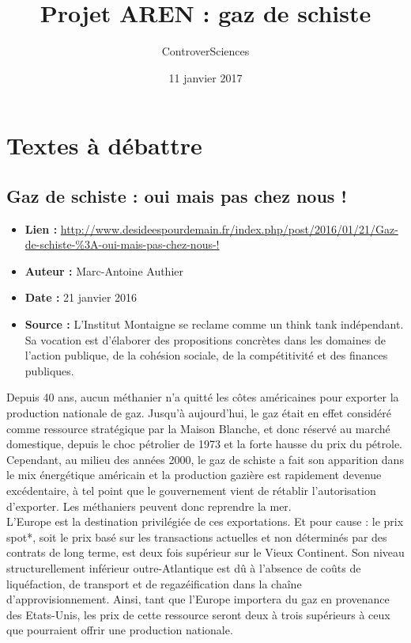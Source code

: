 \documentclass[8pt]{article}
\author{ControverSciences}
\title{Projet AREN : gaz de schiste}
\date{11 janvier 2017}
\begin{document}
\maketitle

\tableofcontents

\newpage
\section{Textes à débattre}
\subsection{Gaz de schiste : oui mais pas chez nous !}
\begin{itemize}
	\item \textbf{Lien : }  \url{http://www.desideespourdemain.fr/index.php/post/2016/01/21/Gaz-de-schiste-\%3A-oui-mais-pas-chez-nous-!} 
	\item \textbf{Auteur : }  Marc-Antoine Authier
	\item \textbf{Date : } 21 janvier 2016 
	\item \textbf{Source : }  L'Institut Montaigne se reclame comme un think tank indépendant. Sa vocation est d'élaborer des propositions concrètes dans les domaines de l'action publique, de la cohésion sociale, de la compétitivité et des finances publiques.

\end{itemize}
Depuis 40 ans, aucun méthanier n’a quitté les côtes américaines pour exporter la production nationale de gaz. Jusqu’à aujourd’hui, le gaz était en effet considéré comme ressource stratégique par la Maison Blanche, et donc réservé au marché domestique, depuis le choc pétrolier de 1973 et la forte hausse du prix du pétrole. Cependant,  au milieu des années 2000, le gaz de schiste a fait son apparition dans le mix énergétique américain et la production gazière est rapidement devenue excédentaire, à tel point que le gouvernement vient de rétablir  l’autorisation d’exporter. Les méthaniers peuvent donc reprendre la mer.\\

L’Europe est la destination privilégiée de ces exportations. Et pour cause : le prix spot*, soit le prix basé sur les transactions actuelles et non déterminés par des contrats de long terme, est deux fois supérieur sur le Vieux Continent. Son niveau structurellement inférieur outre-Atlantique est dû à l’absence de coûts de liquéfaction, de transport et de regazéification dans la chaîne d’approvisionnement. Ainsi, tant que l’Europe importera du gaz en provenance des Etats-Unis, les prix de cette ressource seront deux à trois supérieurs à ceux que pourraient offrir une production nationale.\\
\end{document}
